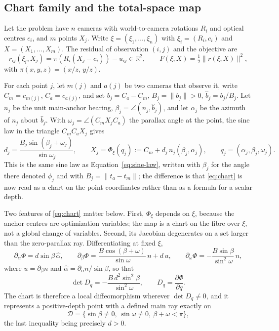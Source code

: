 \documentclass[11pt,a4paper]{article}
\theoremstyle{definition}
\theoremstyle{remark}
\newcommand{\R}{\mathbb{R}}
\begin{document}
\subsection{Chart family and the total-space map}
\label{sec:chart-family}

Let the problem have $n$ cameras with world-to-camera rotations $R_i$ and optical centres $c_i$, and $m$ points $X_j$. Write $\xi=(\xi_1,\dots,\xi_n)$ with $\xi_i=(R_i,c_i)$ and $X=(X_1,\dots,X_m)$. The residual of observation $(i,j)$ and the objective are
\begin{equation}
r_{ij}(\xi_i,X_j)=\pi\!\left(R_i(X_j-c_i)\right)-u_{ij}\in\R^2,
\qquad
F(\xi,X)=\tfrac12\|r(\xi,X)\|^2,
\label{eq:ba-residual}
\end{equation}
with $\pi(x,y,z)=(x/z,\,y/z)$.

For each point $j$, let $m(j)$ and $a(j)$ be two cameras that observe it, write $C_m=c_{m(j)}$, $C_a=c_{a(j)}$, and set $b_j=C_a-C_m$, $B_j=\|b_j\|>0$, $\hat b_j=b_j/B_j$. Let $n_j$ be the unit main-anchor bearing, $\beta_j=\angle(n_j,\hat b_j)$, and let $\alpha_j$ be the azimuth of $n_j$ about $\hat b_j$. With $\omega_j=\angle(C_mX_jC_a)$ the parallax angle at the point, the sine law in the triangle $C_mC_aX_j$ gives
\begin{equation}
d_j=\frac{B_j\sin(\beta_j+\omega_j)}{\sin\omega_j},
\qquad
X_j=\Phi_\xi(q_j):=C_m+d_j\,n_j(\beta_j,\alpha_j),
\qquad
q_j=(\alpha_j,\beta_j,\omega_j).
\label{eq:chart}
\end{equation}
This is the same sine law as Equation~\eqref{eq:sine-law}, written with $\beta_j$ for the angle there denoted $\phi_j$ and with $B_j=\|t_a-t_m\|$; the difference is that \eqref{eq:chart} is now read as a chart on the point coordinates rather than as a formula for a scalar depth.

Two features of \eqref{eq:chart} matter below. First, $\Phi_\xi$ depends on $\xi$, because the anchor centres are optimization variables; the map is a chart on the fibre over $\xi$, not a global change of variables. Second, its Jacobian degenerates on a set larger than the zero-parallax ray. Differentiating at fixed $\xi$,
\begin{equation}
\partial_{\alpha}\Phi=d\sin\beta\,\hat\alpha,\qquad
\partial_{\beta}\Phi=\frac{B\cos(\beta+\omega)}{\sin\omega}\,n+d\,u,\qquad
\partial_{\omega}\Phi=-\frac{B\sin\beta}{\sin^{2}\omega}\,n,
\label{eq:chart-columns}
\end{equation}
where $u=\partial_\beta n$ and $\hat\alpha=\partial_\alpha n/\sin\beta$, so that
\begin{equation}
\det D_q=-\frac{B\,d^{2}\sin^{2}\beta}{\sin^{2}\omega},
\qquad D_q=\frac{\partial\Phi}{\partial q}.
\label{eq:chart-det}
\end{equation}
The chart is therefore a local diffeomorphism wherever $\det D_q\neq0$, and it represents a positive-depth point with a defined main ray exactly on
\begin{equation}
\mathcal D=\{\sin\beta\neq0,\ \sin\omega\neq0,\ \beta+\omega<\pi\},
\label{eq:chart-domain}
\end{equation}
the last inequality being precisely $d>0$.
\end{document}
